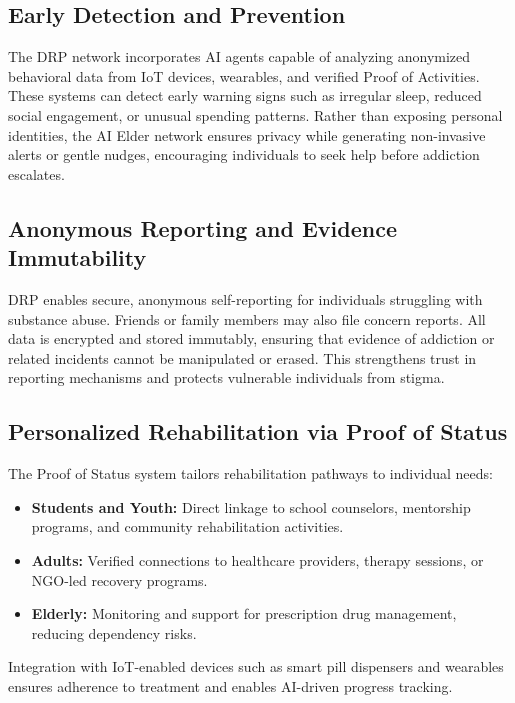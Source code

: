 \documentclass[11pt,a4paper]{article}
\begin{document}
\subsection{Early Detection and Prevention}
The DRP network incorporates AI agents capable of analyzing anonymized behavioral data from IoT devices, wearables, and verified Proof of Activities. These systems can detect early warning signs such as irregular sleep, reduced social engagement, or unusual spending patterns. Rather than exposing personal identities, the AI Elder network ensures privacy while generating non-invasive alerts or gentle nudges, encouraging individuals to seek help before addiction escalates.

\subsection{Anonymous Reporting and Evidence Immutability}
DRP enables secure, anonymous self-reporting for individuals struggling with substance abuse. Friends or family members may also file concern reports. All data is encrypted and stored immutably, ensuring that evidence of addiction or related incidents cannot be manipulated or erased. This strengthens trust in reporting mechanisms and protects vulnerable individuals from stigma.

\subsection{Personalized Rehabilitation via Proof of Status}
The Proof of Status system tailors rehabilitation pathways to individual needs:
\begin{itemize}
    \item \textbf{Students and Youth:} Direct linkage to school counselors, mentorship programs, and community rehabilitation activities.
    \item \textbf{Adults:} Verified connections to healthcare providers, therapy sessions, or NGO-led recovery programs.
    \item \textbf{Elderly:} Monitoring and support for prescription drug management, reducing dependency risks.
\end{itemize}
Integration with IoT-enabled devices such as smart pill dispensers and wearables ensures adherence to treatment and enables AI-driven progress tracking.
\end{document}
